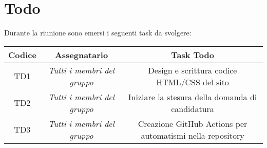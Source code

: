 \section{Todo}

Durante la riunione sono emersi i seguenti task da svolgere:

\vspace{0.5cm}

\begin{table}[htbp]
	\begin{tabular}{|c|c|c|}
		\hline
		\rowcolor[gray]{0.9}
		Codice & Assegnatario & Task Todo \\
		\hline
		TD1 & \it{Tutti i membri del gruppo} & Design e scrittura codice HTML/CSS del sito\\
		\hline
		TD2 & \it{Tutti i membri del gruppo} & Iniziare la stesura della domanda di candidatura \\
		\hline
		TD3 & \it{Tutti i membri del gruppo} & Creazione GitHub Actions per automatismi nella repository \\
		\hline
	\end{tabular}
\end{table}